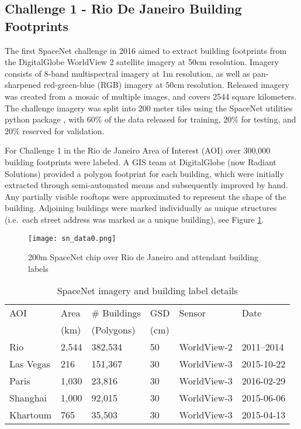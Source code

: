 \documentclass{article}
\begin{document}
\subsection{Challenge 1 - Rio De Janeiro Building Footprints}
The first SpaceNet challenge in 2016 aimed to extract building footprints from the DigitalGlobe WorldView 2 satellite imagery at 50cm resolution.  Imagery consists of 8-band multispectral imagery at 1m resolution, as well as pan-sharpened red-green-blue (RGB) imagery at 50cm resolution.  Released imagery was created from a mosaic of multiple images, and covers 2544 square kilometers.  The challenge imagery was split into 200 meter tiles using the SpaceNet utilities python package \cite{sn_utils},
with 60\% of the data released for training, 20\% for testing, and 20\% reserved for validation. 

For Challenge 1 in the Rio de Janeiro Area of Interest (AOI) over 300,000 building footprints were labeled.
A GIS team at DigitalGlobe (now Radiant Solutions) provided a polygon footprint for each building, which were initially extracted through semi-automated means and subsequently improved by hand.  
Any partially visible rooftops were approximated to represent the shape of the building. Adjoining buildings were marked individually as unique structures (i.e.~each street address was marked as a unique building), see Figure \ref{fig:sn_data0}.



\begin{figure}
  \centering
     \texttt{[image: sn\_data0.png]}
  \caption{200m SpaceNet chip over Rio de Janeiro and attendant building labels}
  \label{fig:sn_data0}
\end{figure}




\begin{table}
  \caption{SpaceNet imagery and building label details}
  \label{tab:data_area}
  \centering
   \begin{tabular}{llllll}
    \toprule
AOI 	& Area  & \# Buildings & GSD & Sensor & Date \\& (km) & (Polygons) & (cm) & & \\
\toprule
Rio & 2,544 &	382,534	& 50 &	WorldView-2	& 2011--2014 \\Las Vegas & 216 & 151,367 &	30	 & WorldView-3 & 2015-10-22  \\Paris & 1,030 & 23,816 & 30 & WorldView-3 & 2016-02-29  \\Shanghai & 1,000 & 92,015 & 30 & WorldView-3 & 2015-06-06  \\Khartoum & 765 & 35,503 & 30 & WorldView-3 & 2015-04-13  \\

    \bottomrule
  \end{tabular}
\end{table}
\end{document}
